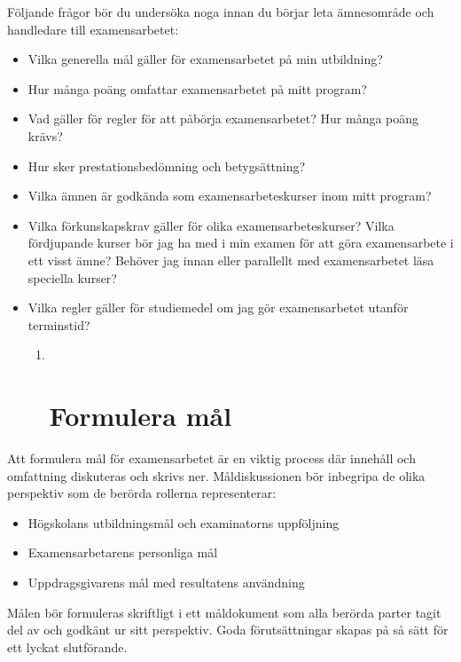 Följande frågor bör du undersöka noga innan du börjar leta ämnesområde
och handledare till examensarbetet:

\begin{itemize}
\item
  Vilka generella mål gäller för examensarbetet på min utbildning?
\item
  Hur många poäng omfattar examensarbetet på mitt program?
\item
  Vad gäller för regler för att påbörja examensarbetet? Hur många poäng
  krävs?
\item
  Hur sker prestationsbedömning och betygsättning?
\item
  Vilka ämnen är godkända som examensarbeteskurser inom mitt program?
\item
  Vilka förkunskapskrav gäller för olika examensarbeteskurser? Vilka
  fördjupande kurser bör jag ha med i min examen för att göra
  examensarbete i ett visst ämne? Behöver jag innan eller parallellt med
  examensarbetet läsa speciella kurser?
\item
  Vilka regler gäller för studiemedel om jag gör examensarbetet utanför
  terminstid?

  \begin{enumerate}
  \def\labelenumi{\arabic{enumi}.}
  \item ~
    \section{Formulera mål}\label{formulera-muxe5l}
  \end{enumerate}
\end{itemize}

Att formulera mål för examensarbetet är en viktig process där innehåll
och omfattning diskuteras och skrivs ner. Måldiskussionen bör inbegripa
de olika perspektiv som de berörda rollerna representerar:

\begin{itemize}
\item
  Högskolans utbildningsmål och examinatorns uppföljning
\item
  Examensarbetarens personliga mål
\item
  Uppdragsgivarens mål med resultatens användning
\end{itemize}

Målen bör formuleras skriftligt i ett måldokument som alla berörda
parter tagit del av och godkänt ur sitt perspektiv. Goda förutsättningar
skapas på så sätt för ett lyckat slutförande.

